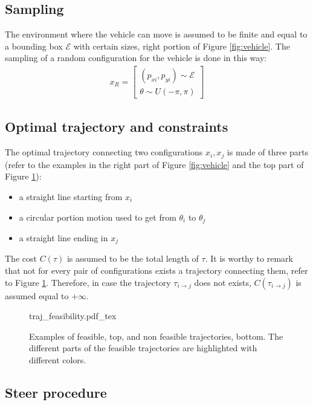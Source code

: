\subsection{Sampling}

The environment where the vehicle can move is assumed to be finite and equal to a bounding box $\mathcal{E}$ with certain sizes, right portion of Figure \ref{fig:vehicle}. The sampling of a random configuration for the vehicle is done in this way:
\begin{eqnarray}
x_R = \begin{bmatrix} (p_{xi} , p_{yi}) \sim \mathcal{E} \\ \theta \sim U(-\pi, \pi) \end{bmatrix}
\end{eqnarray}

\subsection{Optimal trajectory and constraints}

The optimal trajectory connecting two configurations $x_i, x_j$ is made of three parts (refer to the examples in the right part of Figure \ref{fig:vehicle} and the top part of Figure \ref{fig:traj_feas}):
\begin{itemize}
\item a straight line starting from $x_i$
\item a circular portion motion used to get from $\theta_i$ to $\theta_j$
\item a straight line ending in $x_j$
\end{itemize}
The cost $C(\tau)$ is assumed to be the total length of $\tau$. It is worthy to remark that not for every pair of configurations exists a trajectory connecting them, refer to Figure \ref{fig:traj_feas}. Therefore, in case the trajectory $\tau_{i \rightarrow j}$ does not exists, $C(\tau_{i \rightarrow j})$ is assumed equal to $+\infty$.

 \begin{figure}
	 \centering
 \def\svgwidth{0.65 \columnwidth}
 {traj_feasibility.pdf_tex} 
	 \caption{Examples of feasible, top, and non feasible trajectories, bottom. The different parts of the feasible trajectories are highlighted with different colors. }
 \label{fig:traj_feas}
 \end{figure}

\subsection{Steer procedure}

